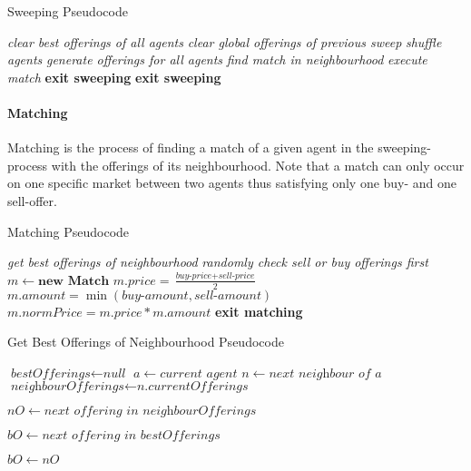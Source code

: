 \documentclass[Bachelorarbeit.tex]{subfiles}
\begin{document}
\begin{algorithm}
\caption{Sweeping Pseudocode}\label{euclid}
\begin{algorithmic}[1]
\State \textit{clear best offerings of all agents}
	\State \textit{clear global offerings of previous sweep}
	\State \textit{shuffle agents}
	\State \textit{generate offerings for all agents}
		\State \textit{find match in neighbourhood}
			\State \textit{execute match}
			\State \textbf{exit sweeping}
		\EndIf 
	\EndFor
	\State \textbf{exit sweeping}
	\EndIf
\EndWhile
\end{algorithmic}
\end{algorithm}

\paragraph{Matching}
Matching is the process of finding a match of a given agent in the sweeping-process with the offerings of its neighbourhood. Note that a match can only occur on one specific market between two agents thus satisfying only one buy- and one sell-offer.

\begin{algorithm}
\caption{Matching Pseudocode}\label{euclid}
\begin{algorithmic}[1]
\State \textit{get best offerings of neighbourhood}
	\State \textit{randomly check sell or buy offerings first}
		\State $m \gets \textbf{new Match}$
		\State $m.price = \frac{\textit{buy-price} + \textit{sell-price}}{2}$
		\State $m.amount = \min(\textit{buy-amount}, \textit{sell-amount})$
		\State $m.normPrice = m.price * m.amount$
		\State \textbf{exit matching}
	\EndIf
\EndFor
\end{algorithmic}
\end{algorithm}

\begin{algorithm}
\caption{Get Best Offerings of Neighbourhood Pseudocode}\label{euclid}
\begin{algorithmic}[1]
\State $\textit{bestOfferings} \gets \textit{null}$
\State $a \gets \textit{current agent}$
	\State $n \gets \textit{next neighbour of a}$
	\State $\textit{neighbourOfferings} \gets \textit{n.currentOfferings}$
	
		\State $nO \gets \textit{next offering in neighbourOfferings}$
		
			\State $bO \gets \textit{next offering in bestOfferings}$
		
				\State $bO \gets nO$
			\EndIf
		\EndFor
	\EndFor
\EndFor
\end{algorithmic}
\end{algorithm}
\end{document}
